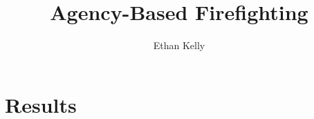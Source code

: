 \documentclass[12pt,a4paper]{article}
\author{Ethan Kelly}
\title{Agency-Based Firefighting}
\begin{document}
\maketitle
\tableofcontents

\newpage

\section{Results}





\end{document}
